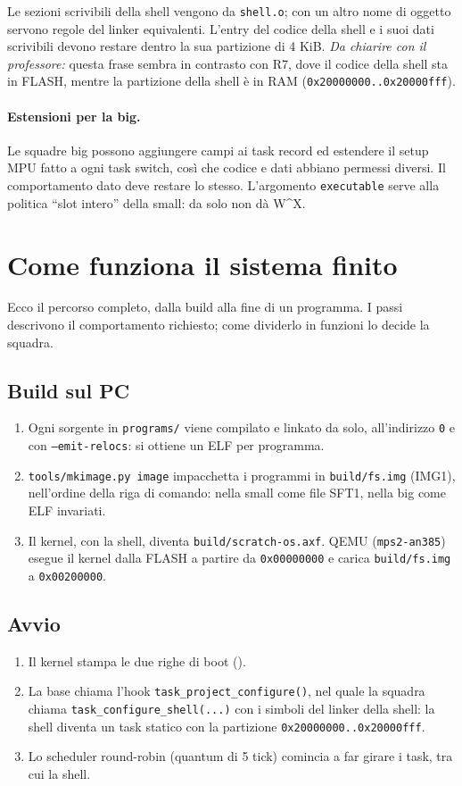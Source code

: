 Le sezioni scrivibili della shell vengono da \texttt{shell.o}; con un altro nome di oggetto servono regole del linker equivalenti. L'entry del codice della shell e i suoi dati scrivibili devono restare dentro la sua partizione di 4 KiB. \emph{Da chiarire con il professore:} questa frase sembra in contrasto con R7, dove il codice della shell sta in FLASH, mentre la partizione della shell è in RAM (\texttt{0x20000000..0x20000fff}).

\paragraph{Estensioni per la big.} Le squadre big possono aggiungere campi ai task record ed estendere il setup MPU fatto a ogni task switch, così che codice e dati abbiano permessi diversi. Il comportamento dato deve restare lo stesso. L'argomento \texttt{executable} serve alla politica ``slot intero'' della small: da solo non dà W\textasciicircum{}X.

\section{Come funziona il sistema finito}

Ecco il percorso completo, dalla build alla fine di un programma. I passi descrivono il comportamento richiesto; come dividerlo in funzioni lo decide la squadra.

\subsection{Build sul PC}
\begin{enumerate}\sloppy
\item Ogni sorgente in \texttt{programs/} viene compilato e linkato da solo, all'indirizzo \texttt{0} e con \texttt{--emit-relocs}: si ottiene un ELF per programma.
\item \texttt{tools/mkimage.py image} impacchetta i programmi in \texttt{build/fs.img} (IMG1), nell'ordine della riga di comando: nella small come file SFT1, nella big come ELF invariati.
\item Il kernel, con la shell, diventa \texttt{build/scratch-os.axf}. QEMU (\texttt{mps2-an385}) esegue il kernel dalla FLASH a partire da \texttt{0x00000000} e carica \texttt{build/fs.img} a \texttt{0x00200000}.
\end{enumerate}

\subsection{Avvio}
\begin{enumerate}\sloppy\setcounter{enumi}{3}
\item Il kernel stampa le due righe di boot ().
\item La base chiama l'hook \texttt{task\_project\_configure()}, nel quale la squadra chiama \texttt{task\_configure\_shell(...)} con i simboli del linker della shell: la shell diventa un task statico con la partizione \texttt{0x20000000..0x20000fff}.
\item Lo scheduler round-robin (quantum di 5 tick) comincia a far girare i task, tra cui la shell.
\end{enumerate}

